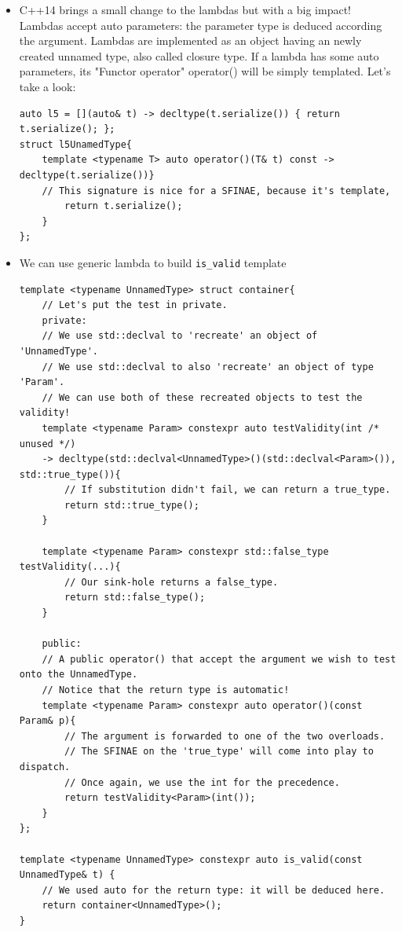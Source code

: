 \documentclass[a4paper,11pt,twoside]{book}
\begin{document}
\begin{itemize}
	\item C++14 brings a small change to the lambdas but with a big impact! Lambdas accept auto parameters: the parameter type is deduced according the argument. Lambdas are implemented as an object having an newly created unnamed type, also called closure type. If a lambda has some auto parameters, its "Functor operator" operator() will be simply templated. Let's take a look:
	
\begin{lstlisting}[numbers=none]
auto l5 = [](auto& t) -> decltype(t.serialize()) { return t.serialize(); };
struct l5UnamedType{
	template <typename T> auto operator()(T& t) const -> decltype(t.serialize())} 
	// This signature is nice for a SFINAE, because it's template, 
		return t.serialize();
	}
};	
\end{lstlisting}
	
	\item We can use generic lambda to build \texttt{is\_valid} template
	
\begin{lstlisting}[numbers=none]
template <typename UnnamedType> struct container{
	// Let's put the test in private.
	private:
	// We use std::declval to 'recreate' an object of 'UnnamedType'.
	// We use std::declval to also 'recreate' an object of type 'Param'.
	// We can use both of these recreated objects to test the validity!
	template <typename Param> constexpr auto testValidity(int /* unused */)
	-> decltype(std::declval<UnnamedType>()(std::declval<Param>()), std::true_type()){
		// If substitution didn't fail, we can return a true_type.
		return std::true_type();
	}
	
	template <typename Param> constexpr std::false_type testValidity(...){
		// Our sink-hole returns a false_type.
		return std::false_type();
	}
	
	public:
	// A public operator() that accept the argument we wish to test onto the UnnamedType.
	// Notice that the return type is automatic!
	template <typename Param> constexpr auto operator()(const Param& p){
		// The argument is forwarded to one of the two overloads.
		// The SFINAE on the 'true_type' will come into play to dispatch.
		// Once again, we use the int for the precedence.
		return testValidity<Param>(int());
	}
};

template <typename UnnamedType> constexpr auto is_valid(const UnnamedType& t) {
	// We used auto for the return type: it will be deduced here.
	return container<UnnamedType>();
}


\end{lstlisting}
\end{itemize}
\end{document}

